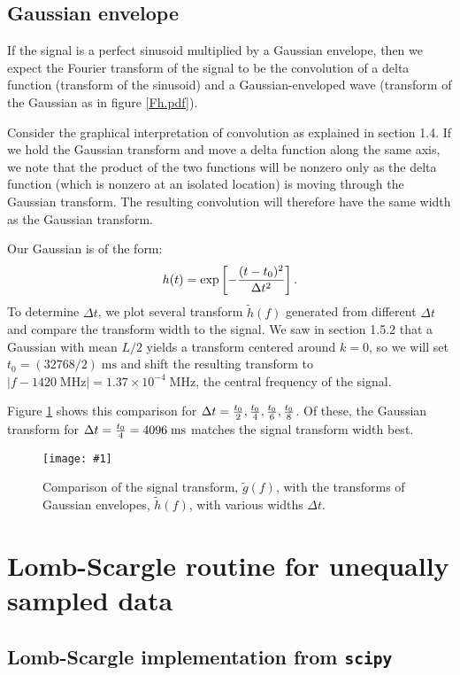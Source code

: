 \documentclass{article}
\theoremstyle{definition}
\newcommand{\un}[1]{\;\mathrm{#1}}
\newcommand{\cc}{\texttt}
\newcommand{\plop}[2]{
    \begin{figure}\centering
        \texttt{[image: \#1]}
        \caption{\label{#1}#2}
    \end{figure}
}
\begin{document}
\subsection{Gaussian envelope}

If the signal is a perfect sinusoid multiplied by a Gaussian envelope,
then we expect the Fourier transform of the signal to be the convolution of
a delta function (transform of the sinusoid) and a Gaussian-enveloped
wave (transform of the Gaussian as in figure \ref{Fh.pdf}).

Consider the graphical interpretation of convolution as explained in section
1.4. If we hold the Gaussian transform and move a delta function along the
same axis, we note that the product of the two functions will be nonzero
only as the delta function (which is nonzero at an isolated location)
is moving through the Gaussian transform. The resulting
convolution will therefore have the same width as the Gaussian transform.

Our Gaussian is of the form:
\begin{align*}
h(t) = \exp\left[-{(t - t_0)^2 \over \Delta t^2}\right].
\end{align*}
To determine $\Delta t$, we plot several transform $\tilde h(f)$
generated from different $\Delta t$ and compare the transform width
to the signal. We saw in section 1.5.2 that a Gaussian with mean
$L/2$ yields a transform centered around $k = 0$, so we will
set $t_0 = (32768/2) \un{ms}$ and shift the resulting transform
to $|f - 1420\un{MHz}| = 1.37 \times 10^{-4} \un{MHz}$, the central
frequency of the signal.

Figure \ref{Fa1_comp.pdf} shows this comparison for $\Delta t =
{t_0 \over 2}, {t_0 \over 4}, {t_0 \over 6}, {t_0 \over 8}$. Of these,
the Gaussian transform for $\Delta t = {t_0 \over 4} = 4096\un{ms}$
matches the signal transform width best.
\plop{Fa1_comp.pdf}{Comparison of the signal transform, $\tilde g(f)$,
with the transforms of Gaussian envelopes, $\tilde h(f)$, with various
widths $\Delta t$.}

\section{Lomb-Scargle routine for unequally sampled data}

\subsection{Lomb-Scargle implementation from \cc{scipy}}
\end{document}

